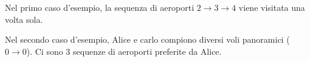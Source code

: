 



\Examples

\begin{example}
\end{example}


\Explanation

Nel primo caso d'esempio, la sequenza di aeroporti $2 \rightarrow 3 \rightarrow 4$ viene visitata una volta sola.

Nel secondo caso d'esempio, Alice e carlo compiono diversi voli panoramici ($0 \rightarrow 0$).
Ci sono $3$ sequenze di aeroporti preferite da Alice.